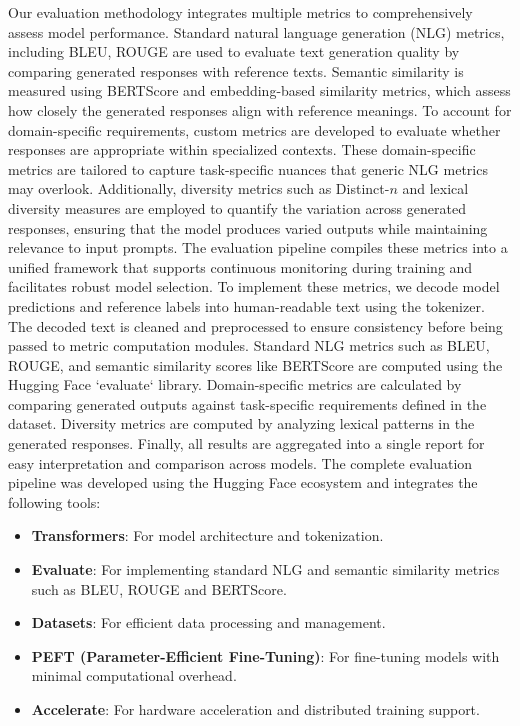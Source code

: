 \documentclass[11pt]{article}
\begin{document}
Our evaluation methodology integrates multiple metrics to comprehensively assess model performance. Standard natural language generation (NLG) metrics, including BLEU, ROUGE are used to evaluate text generation quality by comparing generated responses with reference texts. Semantic similarity is measured using BERTScore and embedding-based similarity metrics, which assess how closely the generated responses align with reference meanings. To account for domain-specific requirements, custom metrics are developed to evaluate whether responses are appropriate within specialized contexts. These domain-specific metrics are tailored to capture task-specific nuances that generic NLG metrics may overlook. Additionally, diversity metrics such as Distinct-$n$ and lexical diversity measures are employed to quantify the variation across generated responses, ensuring that the model produces varied outputs while maintaining relevance to input prompts. The evaluation pipeline compiles these metrics into a unified framework that supports continuous monitoring during training and facilitates robust model selection. To implement these metrics, we decode model predictions and reference labels into human-readable text using the tokenizer. The decoded text is cleaned and preprocessed to ensure consistency before being passed to metric computation modules. Standard NLG metrics such as BLEU, ROUGE,  and semantic similarity scores like BERTScore are computed using the Hugging Face `evaluate` library. Domain-specific metrics are calculated by comparing generated outputs against task-specific requirements defined in the dataset. Diversity metrics are computed by analyzing lexical patterns in the generated responses. Finally, all results are aggregated into a single report for easy interpretation and comparison across models. 
The complete evaluation pipeline was developed using the Hugging Face ecosystem and integrates the following tools:
\begin{itemize}
    \item \textbf{Transformers}: For model architecture and tokenization.
    \item \textbf{Evaluate}: For implementing standard NLG and semantic similarity metrics such as BLEU, ROUGE and BERTScore.
    \item \textbf{Datasets}: For efficient data processing and management.
    \item \textbf{PEFT (Parameter-Efficient Fine-Tuning)}: For fine-tuning models with minimal computational overhead.
    \item \textbf{Accelerate}: For hardware acceleration and distributed training support.
\end{itemize}
\end{document}
